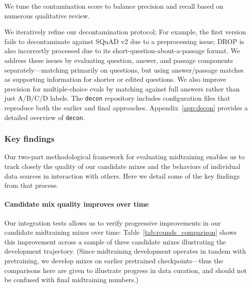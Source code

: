 \documentclass[table]{ai2style/ai2}
\begin{document}
We tune the contamination score to balance precision and recall based on numerous qualitative review.

We iteratively refine our decontamination protocol; 
For example, the first version fails to decontaminate against SQuAD v2 due to a preprocessing issue; 
DROP is also incorrectly processed due to its short-question-about-a-passage format. 
We address these issues by evaluating question, answer, and passage components separately—matching primarily on questions, but using answer/passage matches as supporting information for shorter or edited questions. 
We also improve precision for multiple-choice evals by matching against full answers rather than just A/B/C/D labels. 
The \texttt{decon} repository includes configuration files that reproduce both the earlier and final approaches.
Appendix~\ref{app:decon} provides a detailed overview of \texttt{decon}.

\subsubsection{Key findings}\label{sec:midtraining-findings}

Our two-part methodological framework for evaluating midtraining enables us to track closely the quality of our candidate mixes and the behaviors of individual data sources in interaction with others. Here we detail some of the key findings from that process.

\paragraph{Candidate mix quality improves over time}
Our integration tests allows us to verify progressive improvements in our candidate midtraining mixes over time: Table~\ref{tab:rounds_comparison} shows this improvement across a sample of three candidate mixes illustrating the development trajectory. (Since midtraining development operates in tandem with pretraining, we develop mixes on earlier pretrained checkpoints---thus the comparisons here are given to illustrate progress in data curation, and should not be confused with final midtraining numbers.)
\end{document}
